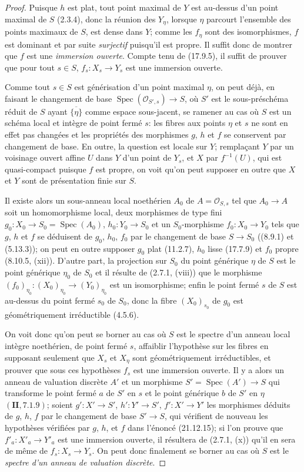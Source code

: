 \begin{proof}
Puisque $h$ est plat, tout point maximal de $Y$ est au-dessus d'un point maximal de $S$
(2.3.4), donc la réunion des $Y_\eta$, lorsque $\eta$ parcourt l'ensemble des points
maximaux de $S$, est dense dans $Y$; comme les $f_\eta$ sont des isomorphismes, $f$
est dominant et par suite \emph{surjectif} puisqu'il est propre. Il suffit donc de montrer
que $f$ est une \emph{immersion ouverte}. Compte tenu de (17.9.5), il suffit de prouver
que pour tout $s\in S$, $f_s:X_s\to Y_s$ est une immersion ouverte.

Comme tout $s\in S$ est générisation d'un point maximal $\eta$, on peut déjà, en
faisant le changement de base $\operatorname{Spec}(\mathcal O_{S',s})\to S$, où $S'$
est le sous-préschéma réduit de $S$ ayant $\overline{\{\eta\}}$ comme espace
sous-jacent, se ramener au cas où $S$ est un schéma local et intègre de point fermé $s$:
les fibres aux points $\eta$ et $s$ ne sont en effet pas changées et les propriétés des
morphismes $g$, $h$ et $f$ se conservent par changement de base. En outre, la question
est locale sur $Y$; remplaçant $Y$ par un voisinage ouvert affine $U$ dans $Y$ d'un point
de $Y_s$, et $X$ par $f^{-1}(U)$, qui est quasi-compact puisque $f$ est propre, on voit
qu'on peut supposer en outre que $X$ et $Y$ sont de présentation finie sur $S$.

Il existe alors un sous-anneau local noethérien $A_0$ de
$A=\mathcal O_{S,s}$ tel que $A_0\to A$ soit un homomorphisme local, deux morphismes
de type fini $g_0:X_0\to S_0=\operatorname{Spec}(A_0)$,
$h_0:Y_0\to S_0$ et un $S_0$-morphisme
$f_0:X_0\to Y_0$ tels que $g$, $h$ et $f$ se déduisent de $g_0$, $h_0$, $f_0$ par le
changement de base $S\to S_0$ ((8.9.1) et (5.13.3)); on peut en outre supposer $g_0$
plat (11.2.7), $h_0$ lisse (17.7.9) et $f_0$ propre (8.10.5, (xii)). D'autre part, la
projection sur $S_0$ du point générique $\eta$ de $S$ est le point générique $\eta_0$ de
$S_0$ et il résulte de (2.7.1, (viii)) que le morphisme
$(f_0)_{\eta_0}:(X_0)_{\eta_0}\to(Y_0)_{\eta_0}$ est un isomorphisme; enfin le point
fermé $s$ de $S$ est au-dessus du point fermé $s_0$ de $S_0$, donc la fibre
$(X_0)_{s_0}$ de $g_0$ est géométriquement irréductible (4.5.6).

On voit donc qu'on peut se borner au cas où $S$ est le spectre d'un anneau local intègre
noethérien, de point fermé $s$, affaiblir l'hypothèse sur les fibres en supposant seulement
que $X_s$ et $X_\eta$ sont géométriquement irréductibles, et prouver que sous ces
hypothèses $f_s$ est une immersion ouverte. Il y a alors un anneau de valuation discrète
$A'$ et un morphisme $S'=\operatorname{Spec}(A')\to S$ qui transforme le point fermé
$a$ de $S'$ en $s$ et le point générique $b$ de $S'$ en $\eta$ $(\mathbf{II}, 7.1.9)$;
soient $g':X'\to S'$, $h':Y'\to S'$, $f':X'\to Y'$ les morphismes déduits de $g$,
$h$, $f$ par le changement de base $S'\to S$, qui vérifient de nouveau les hypothèses
vérifiées par $g$, $h$, et $f$ dans l'énoncé (21.12.15); si l'on prouve que
$f'_a:X'_a\to Y'_a$ est une immersion ouverte, il résultera de (2.7.1, (x)) qu'il en
sera de même de $f_s:X_s\to Y_s$. On peut donc finalement se borner au cas où $S$ est
le \emph{spectre d'un anneau de valuation discrète}.


\end{proof}
